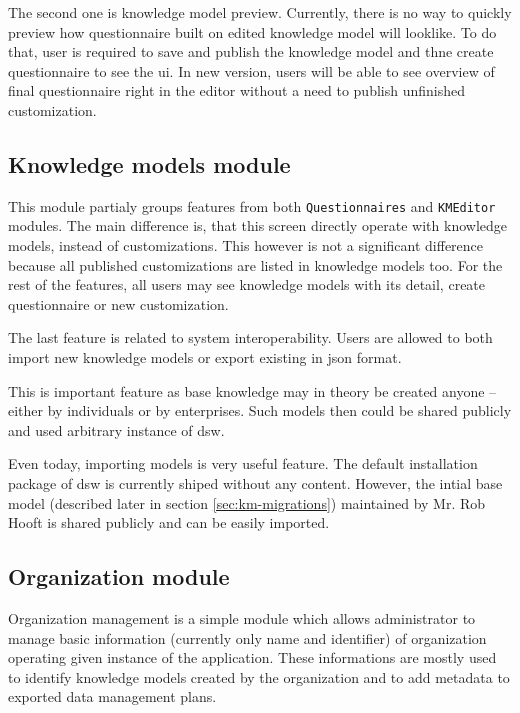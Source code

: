 The second one is knowledge model preview.
Currently, there is no way to quickly preview how questionnaire built on edited knowledge model will looklike.
To do that, user is required to save and publish the knowledge model and thne create questionnaire to see the \gls{ui}.
In new version, users will be able to see overview of final questionnaire right in the editor without a need to publish unfinished customization.


\subsection{Knowledge models module}

This module partialy groups features from both \texttt{Questionnaires} and \texttt{KMEditor} modules.
The main difference is, that this screen directly operate with knowledge models, instead of customizations.
This however is not a significant difference because all published customizations are listed in knowledge models too.
For the rest of the features, all users may see knowledge models with its detail, create questionnaire or new customization.

The last feature is related to system interoperability.
Users are allowed to both import new knowledge models or export existing in \gls{json} format.

This is important feature as base knowledge may in theory be created anyone -- either by individuals or by enterprises.
Such models then could be shared publicly and used arbitrary instance of \gls{dsw}.

Even today, importing models is very useful feature.
The default installation package of \gls{dsw} is currently shiped without any content.
However, the intial base model (described later in section \ref{sec:km-migrations}) maintained by Mr. Rob Hooft is shared publicly and can be easily imported.

\subsection{Organization module}

Organization management is a simple module which allows administrator to manage basic information (currently only name and identifier) of organization operating given instance of the application.
These informations are mostly used to identify knowledge models created by the organization and to add metadata to exported data management plans.

